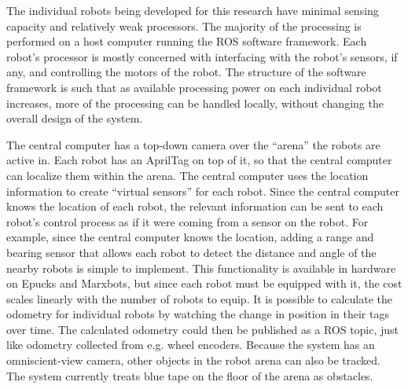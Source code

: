 The individual robots being developed for this research have minimal sensing capacity and relatively weak processors. 
The majority of the processing is performed on a host computer running the ROS software framework. 
Each robot's processor is mostly concerned with interfacing with the robot's sensors, if any, and controlling the motors of the robot. 
The structure of the software framework is such that as available processing power on each individual robot increases, more of the processing can be handled locally, without changing the overall design of the system.

The central computer has a top-down camera over the ``arena'' the robots are active in. 
Each robot has an AprilTag \citep{olson2011tags} on top of it, so that the central computer can localize them within the arena. 
The central computer uses the location information to create ``virtual sensors'' for each robot. 
Since the central computer knows the location of each robot, the relevant information can be sent to each robot's control process as if it were coming from a sensor on the robot. 
For example, since the central computer knows the location, adding a range and bearing sensor that allows each robot to detect the distance and angle of the nearby robots is simple to implement. 
This functionality is available in hardware on Epucks and Marxbots, but since each robot must be equipped with it, the cost scales linearly with the number of robots to equip.  
It is possible to calculate the odometry for individual robots by watching the change in position in their tags over time. 
The calculated odometry could then be published as a ROS topic, just like odometry collected from e.g. wheel encoders. 
Because the system has an omniscient-view camera, other objects in the robot arena can also be tracked. 
The system currently treats blue tape on the floor of the arena as obstacles.

